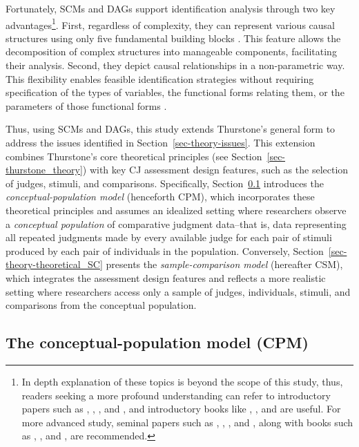\documentclass[
  authoryear,
  review,
  1p]{elsarticle}
\begin{document}
Fortunately, SCMs and DAGs support identification analysis through two
key advantages\footnote{In depth explanation of these topics is beyond
  the scope of this study, thus, readers seeking a more profound
  understanding can refer to introductory papers such as
  \citet{Pearl_2010}, \citet{Rohrer_2018}, \citet{Pearl_2019}, and
  \citet{Cinelli_et_al_2020}, and introductory books like
  \citet{Pearl_et_al_2018}, \citet{Neal_2020}, and
  \citet{McElreath_2020} are useful. For more advanced study, seminal
  papers such as \citet{Neyman_et_al_1923}, \citet{Rubin_1974},
  \citet{Spirtes_et_al_1991}, and \citet{Sekhon_2009}, along with books
  such as \citet{Pearl_2009}, \citet{Morgan_et_al_2014}, and
  \citet{Hernan_et_al_2025}, are recommended.}. First, regardless of
complexity, they can represent various causal structures using only five
fundamental building blocks \citep{Neal_2020, McElreath_2024}. This
feature allows the decomposition of complex structures into manageable
components, facilitating their analysis. Second, they depict causal
relationships in a non-parametric way. This flexibility enables feasible
identification strategies without requiring specification of the types
of variables, the functional forms relating them, or the parameters of
those functional forms \citep{Pearl_et_al_2016}.

Thus, using SCMs and DAGs, this study extends Thurstone's general form
to address the issues identified in Section~\ref{sec-theory-issues}.
This extension combines Thurstone's core theoretical principles (see
Section~\ref{sec-thurstone_theory}) with key CJ assessment design
features, such as the selection of judges, stimuli, and comparisons.
Specifically, Section~\ref{sec-theory-theoretical_P} introduces the
\emph{conceptual-population model} (henceforth CPM), which incorporates
these theoretical principles and assumes an idealized setting where
researchers observe a \emph{conceptual population} of comparative
judgment data--that is, data representing all repeated judgments made by
every available judge for each pair of stimuli produced by each pair of
individuals in the population. Conversely,
Section~\ref{sec-theory-theoretical_SC} presents the
\emph{sample-comparison model} (hereafter CSM), which integrates the
assessment design features and reflects a more realistic setting where
researchers access only a sample of judges, individuals, stimuli, and
comparisons from the conceptual population.

\subsection{The conceptual-population model
(CPM)}\label{sec-theory-theoretical_P}
\end{document}
